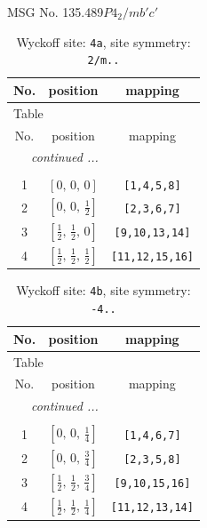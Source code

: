 \documentclass[fleqn,8pt]{jsarticle}
\begin{document}
\setcounter{MaxMatrixCols}{32}

\renewcommand{\tablename}{Table~}
\renewcommand{\figurename}{Figure~}
\begin{center}
\LARGE
MSG No. 135.489\quad$P4_{2}/mb'c'$
\end{center}
\renewcommand{\arraystretch}{1.2}
\begin{longtable}{ccc}
\caption{Wyckoff site: {\tt 4a}, site symmetry: {\tt 2/m..}}
 \\
 \hline \hline
No. & position & mapping \\ \hline \endfirsthead

\multicolumn{2}{l}{\tablename\ \thetable{}} \\
 \hline \hline
No. & position & mapping \\ \hline \endhead

 \hline \hline
\multicolumn{2}{r}{\footnotesize\it continued ...} \\ \endfoot

 \hline \hline
\multicolumn{2}{r}{} \\ \endlastfoot

1 & $\left[ 0,\, 0,\, 0 \right]$ & {\tt [1,4,5,8]} \\ \hline
2 & $\left[ 0,\, 0,\, \frac{1}{2} \right]$ & {\tt [2,3,6,7]} \\ \hline
3 & $\left[ \frac{1}{2},\, \frac{1}{2},\, 0 \right]$ & {\tt [9,10,13,14]} \\ \hline
4 & $\left[ \frac{1}{2},\, \frac{1}{2},\, \frac{1}{2} \right]$ & {\tt [11,12,15,16]} \\
\end{longtable}
\renewcommand{\arraystretch}{1.2}
\begin{longtable}{ccc}
\caption{Wyckoff site: {\tt 4b}, site symmetry: {\tt -4..}}
 \\
 \hline \hline
No. & position & mapping \\ \hline \endfirsthead

\multicolumn{2}{l}{\tablename\ \thetable{}} \\
 \hline \hline
No. & position & mapping \\ \hline \endhead

 \hline \hline
\multicolumn{2}{r}{\footnotesize\it continued ...} \\ \endfoot

 \hline \hline
\multicolumn{2}{r}{} \\ \endlastfoot

1 & $\left[ 0,\, 0,\, \frac{1}{4} \right]$ & {\tt [1,4,6,7]} \\ \hline
2 & $\left[ 0,\, 0,\, \frac{3}{4} \right]$ & {\tt [2,3,5,8]} \\ \hline
3 & $\left[ \frac{1}{2},\, \frac{1}{2},\, \frac{3}{4} \right]$ & {\tt [9,10,15,16]} \\ \hline
4 & $\left[ \frac{1}{2},\, \frac{1}{2},\, \frac{1}{4} \right]$ & {\tt [11,12,13,14]} \\
\end{longtable}
\end{document}
